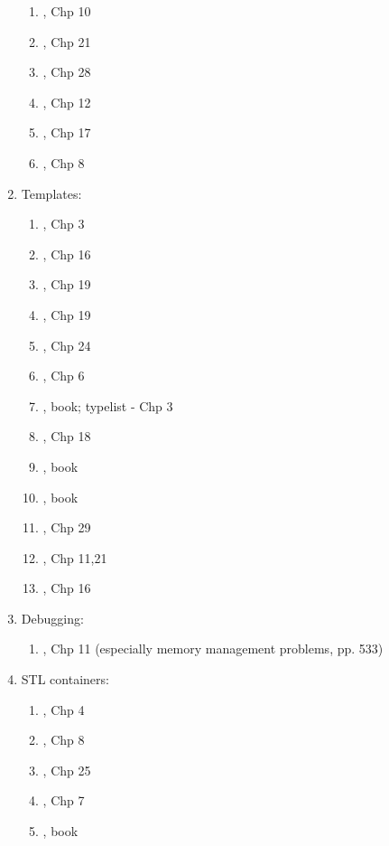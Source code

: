 \begin{enumerate}
\begin{enumerate}
	\item \cite{Vermeir2001}, Chp 10
	\item \cite{Schildt2003}, Chp 21
	\item \cite{Allain2012}, Chp 28
	\item \cite{Gregoire2014}, Chp 12
	\item \cite{Prata2012}, Chp 17
	\item \cite{Lippman2013}, Chp 8
	\end{enumerate}
\item Templates: \vspace{-0.3cm}
	\begin{enumerate} \itemsep -2pt
	\item \cite{Eckel2003}, Chp 3
	\item \cite{Eckel2000}, Chp 16
	\item \cite{Stroustrup2014}, Chp 19
	\item \cite{Stroustrup2009}, Chp 19
	\item \cite{Oualline2003}, Chp 24
	\item \cite{Vermeir2001}, Chp 6
	\item \cite{Alexandrescu2001}, book; typelist - Chp 3
	\item \cite{Schildt2003}, Chp 18
	\item \cite{Vandevoorde2003}, book
	\item \cite{Abrahams2005}, book
	\item \cite{Allain2012}, Chp 29
	\item \cite{Gregoire2014}, Chp 11,21
	\item \cite{Lippman2013}, Chp 16
	\end{enumerate}
\item Debugging: \vspace{-0.3cm}
	\begin{enumerate} \itemsep -2pt
	\item \cite{Eckel2003}, Chp 11 (especially memory management problems, pp. 533)
	\end{enumerate}
\item STL containers: \vspace{-0.3cm}
	\begin{enumerate} \itemsep -2pt
	\item \cite{Eckel2003}, Chp 4
	\item \cite{Schildt2004a}, Chp 8
	\item \cite{Oualline2003}, Chp 25
	\item \cite{Vermeir2001}, Chp 7
	\item \cite{Reese2006a}, book

\end{enumerate}
\end{enumerate}
